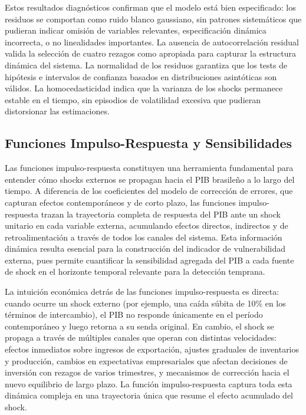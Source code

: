 \documentclass[3p,11pt,draft,natbib=false]{elsarticle}
\begin{document}
Estos resultados diagnósticos confirman que el modelo está bien especificado: los residuos se comportan como ruido blanco gaussiano, sin patrones sistemáticos que pudieran indicar omisión de variables relevantes, especificación dinámica incorrecta, o no linealidades importantes. La ausencia de autocorrelación residual valida la selección de cuatro rezagos como apropiada para capturar la estructura dinámica del sistema. La normalidad de los residuos garantiza que los tests de hipótesis e intervalos de confianza basados en distribuciones asintóticas son válidos. La homocedasticidad indica que la varianza de los shocks permanece estable en el tiempo, sin episodios de volatilidad excesiva que pudieran distorsionar las estimaciones.

\subsection{Funciones Impulso-Respuesta y Sensibilidades}
\label{sec:irf}

Las funciones impulso-respuesta constituyen una herramienta fundamental para entender cómo shocks externos se propagan hacia el PIB brasileño a lo largo del tiempo. A diferencia de los coeficientes del modelo de corrección de errores, que capturan efectos contemporáneos y de corto plazo, las funciones impulso-respuesta trazan la trayectoria completa de respuesta del PIB ante un shock unitario en cada variable externa, acumulando efectos directos, indirectos y de retroalimentación a través de todos los canales del sistema. Esta información dinámica resulta esencial para la construcción del indicador de vulnerabilidad externa, pues permite cuantificar la sensibilidad agregada del PIB a cada fuente de shock en el horizonte temporal relevante para la detección temprana.

La intuición económica detrás de las funciones impulso-respuesta es directa: cuando ocurre un shock externo (por ejemplo, una caída súbita de 10\% en los términos de intercambio), el PIB no responde únicamente en el período contemporáneo y luego retorna a su senda original. En cambio, el shock se propaga a través de múltiples canales que operan con distintas velocidades: efectos inmediatos sobre ingresos de exportación, ajustes graduales de inventarios y producción, cambios en expectativas empresariales que afectan decisiones de inversión con rezagos de varios trimestres, y mecanismos de corrección hacia el nuevo equilibrio de largo plazo. La función impulso-respuesta captura toda esta dinámica compleja en una trayectoria única que resume el efecto acumulado del shock.
\end{document}
